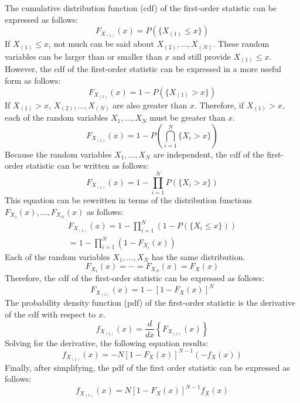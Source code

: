 \documentclass[conference]{IEEEtran}
\begin{document}
The cumulative distribution function (cdf) of the first-order statistic can be expressed as follows:
\begin{equation}
F_{X_{(1)}}(x) = P(\{X_{(1)} \leq x\})
\end{equation}
If $X_{(1)} \leq x$, not much can be said about $X_{(2)},...,X_{(N)}$. These random variables can be larger than or smaller than $x$ and still provide $X_{(1)} \leq x$. However, the cdf of the first-order statistic can be expressed in a more useful form as follows:
\begin{equation}
F_{X_{(1)}}(x) = 1 - P(\{X_{(1)} > x\})
\end{equation}
If $X_{(1)} > x$, $X_{(2)},...,X_{(N)}$ are also greater than $x$. Therefore, if  $X_{(1)} > x$, each of the random variables $X_1,...,X_N$ must be greater than $x$. 
\begin{equation}
F_{X_{(1)}}(x) = 1 - P\left(\bigcap_{i=1}^N\{X_i > x\}\right)
\end{equation}
Because the random variables $X_1,...,X_N$ are independent, the cdf of the first-order statistic can be written as follows:
\begin{equation}
F_{X_{(1)}}(x) = 1 - \prod_{i=1}^N P(\{X_i > x\})
\end{equation}
This equation can be rewritten in terms of the distribution functions $F_{X_1}(x),...,F_{X_N}(x)$ as follows:
\begin{equation}
\begin{gathered}
F_{X_{(1)}}(x) = 1 - \prod_{i=1}^N (1-P(\{X_i \leq x\}))\\
= 1 - \prod_{i=1}^N (1-F_{X_i}(x))
\end{gathered}
\end{equation}
Each of the random variables $X_1,...,X_N$ has the same distribution.
\begin{equation}
F_{X_1}(x)=\cdots=F_{X_N}(x)=F_X(x)
\end{equation}
Therefore, the cdf of the first-order statistic can be expressed as follows: 
\begin{equation}
F_{X_{(1)}}(x) = 1 - [1 - F_X(x)]^N
\end{equation}
The probability density function (pdf) of the first-order statistic is the derivative of the cdf with respect to $x$.
\begin{equation}
f_{X_{(1)}}(x) = \frac{d}{dx}\left\{F_{X_{(1)}}(x)\right\}
\end{equation}
Solving for the derivative, the following equation results:
\begin{equation}
f_{X_{(1)}}(x) = -N[1 - F_X(x)]^{N-1}(-f_X(x))
\end{equation}
Finally, after simplifying, the pdf of the first order statistic can be expressed as follows:
\begin{equation}
f_{X_{(1)}}(x) = N[1 - F_X(x)]^{N-1}f_X(x)
\end{equation}
\end{document}
